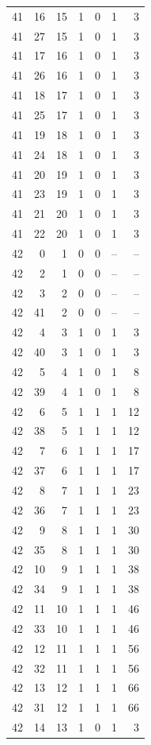 \begin{longtable}{rrrrrrr}
41 & 16 & 15 & 1 & 0 & 1 & 3\\
41 & 27 & 15 & 1 & 0 & 1 & 3\\
41 & 17 & 16 & 1 & 0 & 1 & 3\\
41 & 26 & 16 & 1 & 0 & 1 & 3\\
41 & 18 & 17 & 1 & 0 & 1 & 3\\
41 & 25 & 17 & 1 & 0 & 1 & 3\\
41 & 19 & 18 & 1 & 0 & 1 & 3\\
41 & 24 & 18 & 1 & 0 & 1 & 3\\
41 & 20 & 19 & 1 & 0 & 1 & 3\\
41 & 23 & 19 & 1 & 0 & 1 & 3\\
41 & 21 & 20 & 1 & 0 & 1 & 3\\
41 & 22 & 20 & 1 & 0 & 1 & 3\\
42 & 0 & 1 & 0 & 0 & -- & --\\
42 & 2 & 1 & 0 & 0 & -- & --\\
42 & 3 & 2 & 0 & 0 & -- & --\\
42 & 41 & 2 & 0 & 0 & -- & --\\
42 & 4 & 3 & 1 & 0 & 1 & 3\\
42 & 40 & 3 & 1 & 0 & 1 & 3\\
42 & 5 & 4 & 1 & 0 & 1 & 8\\
42 & 39 & 4 & 1 & 0 & 1 & 8\\
42 & 6 & 5 & 1 & 1 & 1 & 12\\
42 & 38 & 5 & 1 & 1 & 1 & 12\\
42 & 7 & 6 & 1 & 1 & 1 & 17\\
42 & 37 & 6 & 1 & 1 & 1 & 17\\
42 & 8 & 7 & 1 & 1 & 1 & 23\\
42 & 36 & 7 & 1 & 1 & 1 & 23\\
42 & 9 & 8 & 1 & 1 & 1 & 30\\
42 & 35 & 8 & 1 & 1 & 1 & 30\\
42 & 10 & 9 & 1 & 1 & 1 & 38\\
42 & 34 & 9 & 1 & 1 & 1 & 38\\
42 & 11 & 10 & 1 & 1 & 1 & 46\\
42 & 33 & 10 & 1 & 1 & 1 & 46\\
42 & 12 & 11 & 1 & 1 & 1 & 56\\
42 & 32 & 11 & 1 & 1 & 1 & 56\\
42 & 13 & 12 & 1 & 1 & 1 & 66\\
42 & 31 & 12 & 1 & 1 & 1 & 66\\
42 & 14 & 13 & 1 & 0 & 1 & 3\\

\end{longtable}
